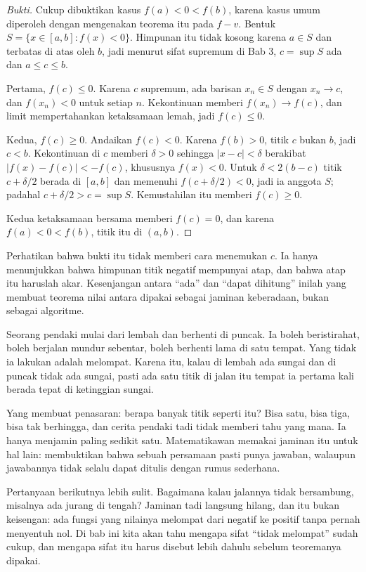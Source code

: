 \begin{proof}[Bukti]
Cukup dibuktikan kasus $f(a)<0<f(b)$, karena kasus umum diperoleh dengan mengenakan
teorema itu pada $f-v$. Bentuk $S=\{x\in[a,b] : f(x)<0\}$. Himpunan itu tidak kosong
karena $a\in S$ dan terbatas di atas oleh $b$, jadi menurut sifat supremum di Bab 3,
$c=\sup S$ ada dan $a\le c\le b$.

Pertama, $f(c)\le 0$. Karena $c$ supremum, ada barisan $x_{n}\in S$ dengan $x_{n}\to c$,
dan $f(x_{n})<0$ untuk setiap $n$. Kekontinuan memberi $f(x_{n})\to f(c)$, dan limit
mempertahankan ketaksamaan lemah, jadi $f(c)\le 0$.

Kedua, $f(c)\ge 0$. Andaikan $f(c)<0$. Karena $f(b)>0$, titik $c$ bukan $b$, jadi
$c<b$. Kekontinuan di $c$ memberi $\delta>0$ sehingga $|x-c|<\delta$ berakibat
$|f(x)-f(c)|<-f(c)$, khususnya $f(x)<0$. Untuk $\delta<2(b-c)$ titik $c+\delta/2$
berada di $[a,b]$ dan memenuhi $f(c+\delta/2)<0$, jadi ia anggota $S$; padahal
$c+\delta/2>c=\sup S$. Kemustahilan itu memberi $f(c)\ge 0$.

Kedua ketaksamaan bersama memberi $f(c)=0$, dan karena $f(a)<0<f(b)$, titik itu di
$(a,b)$.
\end{proof}

Perhatikan bahwa bukti itu tidak memberi cara menemukan $c$. Ia hanya menunjukkan
bahwa himpunan titik negatif mempunyai atap, dan bahwa atap itu haruslah akar.
Kesenjangan antara ``ada'' dan ``dapat dihitung'' inilah yang membuat teorema nilai
antara dipakai sebagai jaminan keberadaan, bukan sebagai algoritme.

\begin{untukanak}
Seorang pendaki mulai dari lembah dan berhenti di puncak. Ia boleh beristirahat,
boleh berjalan mundur sebentar, boleh berhenti lama di satu tempat. Yang tidak ia
lakukan adalah melompat. Karena itu, kalau di lembah ada sungai dan di puncak tidak
ada sungai, pasti ada satu titik di jalan itu tempat ia pertama kali berada tepat di
ketinggian sungai.

Yang membuat penasaran: berapa banyak titik seperti itu? Bisa satu, bisa tiga, bisa
tak berhingga, dan cerita pendaki tadi tidak memberi tahu yang mana. Ia hanya
menjamin paling sedikit satu. Matematikawan memakai jaminan itu untuk hal lain:
membuktikan bahwa sebuah persamaan pasti punya jawaban, walaupun jawabannya tidak
selalu dapat ditulis dengan rumus sederhana.

Pertanyaan berikutnya lebih sulit. Bagaimana kalau jalannya tidak bersambung, misalnya
ada jurang di tengah? Jaminan tadi langsung hilang, dan itu bukan keisengan: ada
fungsi yang nilainya melompat dari negatif ke positif tanpa pernah menyentuh nol.
Di bab ini kita akan tahu mengapa sifat ``tidak melompat'' sudah cukup, dan mengapa
sifat itu harus disebut lebih dahulu sebelum teoremanya dipakai.
\end{untukanak}

